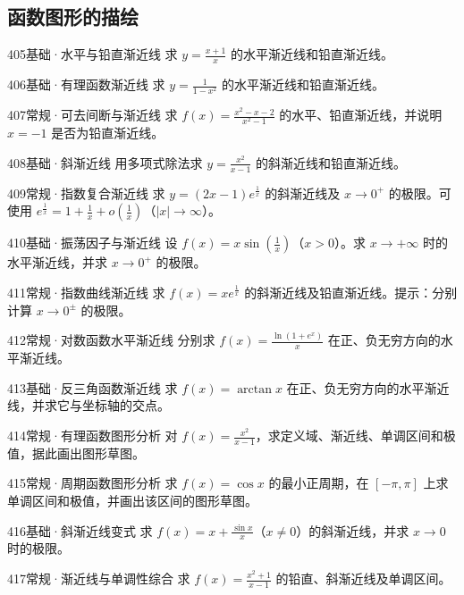 \subsection{函数图形的描绘}
\begin{exercise}{405}{基础·水平与铅直渐近线}
求 $y=\frac{x+1}{x}$ 的水平渐近线和铅直渐近线。
\end{exercise}
\begin{exercise}{406}{基础·有理函数渐近线}
求 $y=\frac{1}{1-x^2}$ 的水平渐近线和铅直渐近线。
\end{exercise}
\begin{exercise}{407}{常规·可去间断与渐近线}
求 $f(x)=\frac{x^2-x-2}{x^2-1}$ 的水平、铅直渐近线，并说明 $x=-1$ 是否为铅直渐近线。
\end{exercise}
\begin{exercise}{408}{基础·斜渐近线}
用多项式除法求 $y=\frac{x^2}{x-1}$ 的斜渐近线和铅直渐近线。
\end{exercise}
\begin{exercise}{409}{常规·指数复合渐近线}
求 $y=(2x-1)e^{\frac{1}{x}}$ 的斜渐近线及 $x\to0^+$ 的极限。可使用 $e^{\frac{1}{x}}=1+\frac{1}{x}+o(\frac{1}{x})$（$|x|\to\infty$）。
\end{exercise}
\begin{exercise}{410}{基础·振荡因子与渐近线}
设 $f(x)=x\sin(\frac{1}{x})$（$x>0$）。求 $x\to+\infty$ 时的水平渐近线，并求 $x\to0^+$ 的极限。
\end{exercise}
\begin{exercise}{411}{常规·指数曲线渐近线}
求 $f(x)=xe^{\frac{1}{x}}$ 的斜渐近线及铅直渐近线。提示：分别计算 $x\to0^\pm$ 的极限。
\end{exercise}
\begin{exercise}{412}{常规·对数函数水平渐近线}
分别求 $f(x)=\frac{\ln(1+e^x)}{x}$ 在正、负无穷方向的水平渐近线。
\end{exercise}
\begin{exercise}{413}{基础·反三角函数渐近线}
求 $f(x)=\arctan x$ 在正、负无穷方向的水平渐近线，并求它与坐标轴的交点。
\end{exercise}
\begin{exercise}{414}{常规·有理函数图形分析}
对 $f(x)=\frac{x^2}{x-1}$，求定义域、渐近线、单调区间和极值，据此画出图形草图。
\end{exercise}
\begin{exercise}{415}{常规·周期函数图形分析}
求 $f(x)=\cos x$ 的最小正周期，在 $[-\pi,\pi]$ 上求单调区间和极值，并画出该区间的图形草图。
\end{exercise}
\begin{exercise}{416}{基础·斜渐近线变式}
求 $f(x)=x+\frac{\sin x}{x}$（$x\ne0$）的斜渐近线，并求 $x\to0$ 时的极限。
\end{exercise}
\begin{exercise}{417}{常规·渐近线与单调性综合}
求 $f(x)=\frac{x^2+1}{x-1}$ 的铅直、斜渐近线及单调区间。
\end{exercise}

